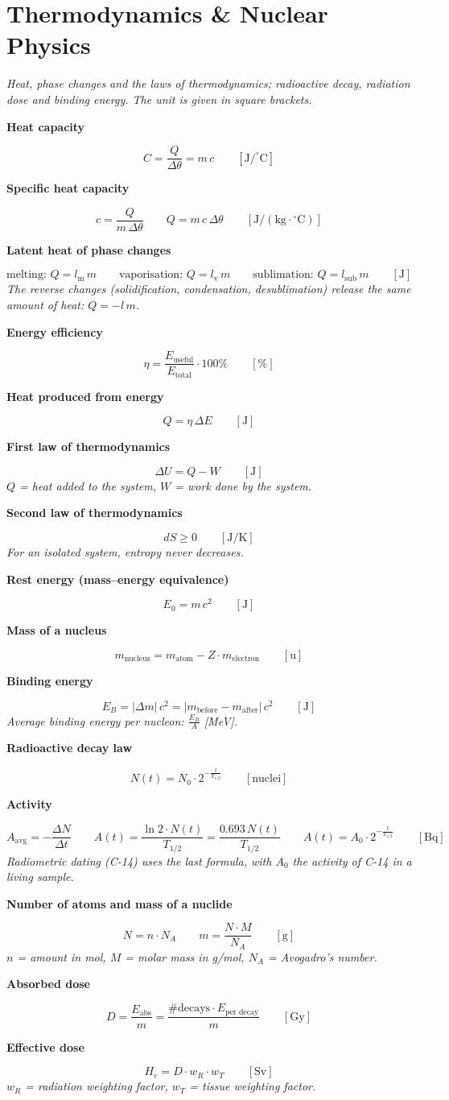 \documentclass[11pt]{article}
\newcommand{\sect}[2]{\section*{\color{#1}#2}}
\newcommand{\sub}[1]{\par\medskip\textbf{#1}\par}
\newcommand{\expl}[1]{{\color{gray}\itshape #1}\par}
\begin{document}
\sect{cThe}{Thermodynamics \& Nuclear Physics}
\expl{Heat, phase changes and the laws of thermodynamics; radioactive decay, radiation dose and binding energy. The unit is given in square brackets.}

\sub{Heat capacity}
\[ C = \frac{Q}{\Delta\theta} = m\,c \qquad [\mathrm{J/^\circ C}] \]

\sub{Specific heat capacity}
\[ c = \frac{Q}{m\,\Delta\theta} \qquad Q = m\,c\,\Delta\theta \qquad [\mathrm{J/(kg\cdot{}^\circ C)}] \]

\sub{Latent heat of phase changes}
\[ \text{melting: } Q = l_{\text{m}}\,m \qquad \text{vaporisation: } Q = l_{\text{v}}\,m \qquad \text{sublimation: } Q = l_{\text{sub}}\,m \qquad [\mathrm{J}] \]
\expl{The reverse changes (solidification, condensation, desublimation) release the same amount of heat: $Q = -l\,m$.}

\sub{Energy efficiency}
\[ \eta = \frac{E_{\text{useful}}}{E_{\text{total}}}\cdot 100\% \qquad [\%] \]

\sub{Heat produced from energy}
\[ Q = \eta\,\Delta E \qquad [\mathrm{J}] \]

\sub{First law of thermodynamics}
\[ \Delta U = Q - W \qquad [\mathrm{J}] \]
\expl{$Q$ = heat added to the system, $W$ = work done by the system.}

\sub{Second law of thermodynamics}
\[ dS \ge 0 \qquad [\mathrm{J/K}] \]
\expl{For an isolated system, entropy never decreases.}

\sub{Rest energy (mass–energy equivalence)}
\[ E_0 = m\,c^2 \qquad [\mathrm{J}] \]

\sub{Mass of a nucleus}
\[ m_{\text{nucleus}} = m_{\text{atom}} - Z\cdot m_{\text{electron}} \qquad [\mathrm{u}] \]

\sub{Binding energy}
\[ E_B = |\Delta m|\,c^2 = |m_{\text{before}} - m_{\text{after}}|\,c^2 \qquad [\mathrm{J}] \]
\expl{Average binding energy per nucleon: $\frac{E_B}{A}$ [MeV].}

\sub{Radioactive decay law}
\[ N(t) = N_0\cdot 2^{-\frac{t}{T_{1/2}}} \qquad [\text{nuclei}] \]

\sub{Activity}
\[ A_{\text{avg}} = -\frac{\Delta N}{\Delta t} \qquad A(t) = \frac{\ln 2\cdot N(t)}{T_{1/2}} = \frac{0.693\,N(t)}{T_{1/2}} \qquad A(t) = A_0\cdot 2^{-\frac{t}{T_{1/2}}} \qquad [\mathrm{Bq}] \]
\expl{Radiometric dating (C-14) uses the last formula, with $A_0$ the activity of C-14 in a living sample.}

\sub{Number of atoms and mass of a nuclide}
\[ N = n\cdot N_A \qquad m = \frac{N\cdot M}{N_A} \qquad [\mathrm{g}] \]
\expl{$n$ = amount in mol, $M$ = molar mass in g/mol, $N_A$ = Avogadro's number.}

\sub{Absorbed dose}
\[ D = \frac{E_{\text{abs}}}{m} = \frac{\#\text{decays}\cdot E_{\text{per decay}}}{m} \qquad [\mathrm{Gy}] \]

\sub{Effective dose}
\[ H_e = D\cdot w_R\cdot w_T \qquad [\mathrm{Sv}] \]
\expl{$w_R$ = radiation weighting factor, $w_T$ = tissue weighting factor.}
\end{document}
